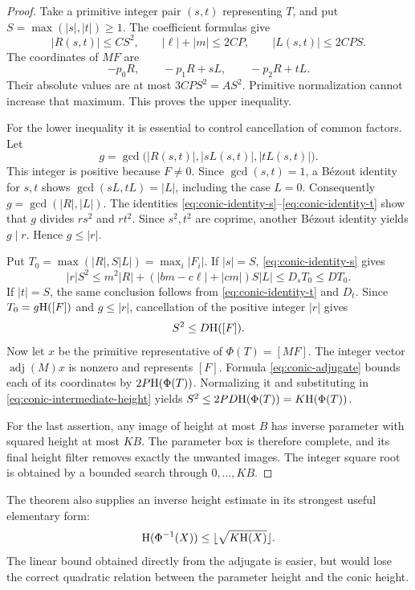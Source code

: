 \begin{proof}
Take a primitive integer pair $(s,t)$ representing $T$, and put
$S=\max(|s|,|t|)\geq1$.
The coefficient formulas give
\[
 |R(s,t)|\leq CS^2,
 \qquad |\ell|+|m|\leq2CP,
 \qquad |L(s,t)|\leq2CPS.
\]
The coordinates of $MF$ are
\[
 -p_0R,\qquad -p_1R+sL,\qquad -p_2R+tL.
\]
Their absolute values are at most $3CPS^2=AS^2$.  Primitive
normalization cannot increase that maximum.  This proves the upper
inequality.

For the lower inequality it is essential to control cancellation of
common factors.  Let
\[
 g=\gcd\bigl(|R(s,t)|,|sL(s,t)|,|tL(s,t)|\bigr).
\]
This integer is positive because $F\ne0$.
Since $\gcd(s,t)=1$, a B\'ezout identity for $s,t$ shows
$\gcd(sL,tL)=|L|$, including the case $L=0$.  Consequently
$g=\gcd(|R|,|L|)$.  The identities
\eqref{eq:conic-identity-s}--\eqref{eq:conic-identity-t} show that
$g$ divides $rs^2$ and $rt^2$.  Since $s^2,t^2$ are coprime, another
B\'ezout identity yields $g\mid r$.  Hence $g\leq|r|$.

Put $T_0=\max(|R|,S|L|)=\max_i|F_i|$.
If $|s|=S$, \eqref{eq:conic-identity-s} gives
\[
 |r|S^2\leq m^2|R|+
 (|bm-c\ell|+|cm|)S|L|\leq D_sT_0\leq DT_0.
\]
If $|t|=S$, the same conclusion follows from
\eqref{eq:conic-identity-t} and $D_t$.
Since $T_0=g\mathrm H([F])$ and $g\leq|r|$, cancellation of the positive
integer $|r|$ gives
\begin{equation}\label{eq:conic-intermediate-height}
 S^2\leq D\mathrm H([F]).
\end{equation}
Now let $x$ be the primitive representative of $\Phi(T)=[MF]$.
The integer vector $\operatorname{adj}(M)x$ is nonzero and represents
$[F]$.  Formula \eqref{eq:conic-adjugate} bounds each of its
coordinates by $2P\mathrm H(\Phi(T))$.  Normalizing it and substituting in
\eqref{eq:conic-intermediate-height} yields
$S^2\leq2PD\mathrm H(\Phi(T))=K\mathrm H(\Phi(T))$.

For the last assertion, any image of height at most $B$ has inverse
parameter with squared height at most $KB$.  The parameter box is
therefore complete, and its final height filter removes exactly the
unwanted images.  The integer square root is obtained by a bounded
search through $0,\ldots,KB$.
\end{proof}

The theorem also supplies an inverse height estimate in its strongest
useful elementary form:
\[
 \mathrm H(\Phi^{-1}(X))\leq\lfloor\sqrt{K\mathrm H(X)}\rfloor.
\]
The linear bound obtained directly from the adjugate is easier, but
would lose the correct quadratic relation between the parameter
height and the conic height.

